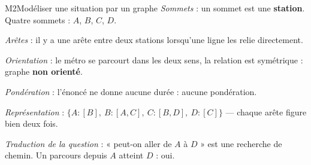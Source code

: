 \begin{fichemethode}{M2}{Modéliser une situation par un graphe}
\emph{Sommets} : un sommet est une \textbf{station}. Quatre sommets : $A$, $B$, $C$, $D$.

\emph{Arêtes} : il y a une arête entre deux stations lorsqu'une ligne les relie
directement.

\emph{Orientation} : le métro se parcourt dans les deux sens, la relation est symétrique :
graphe \textbf{non orienté}.

\emph{Pondération} : l'énoncé ne donne aucune durée : aucune pondération.

\emph{Représentation} : $\{A: [B],\ B: [A, C],\ C: [B, D],\ D: [C]\}$ — chaque arête figure
bien deux fois.

\emph{Traduction de la question} : « peut-on aller de $A$ à $D$ » est une recherche de chemin.
Un parcours depuis $A$ atteint $D$ : oui.

%
%
%
%
%
%
%


\end{fichemethode}
